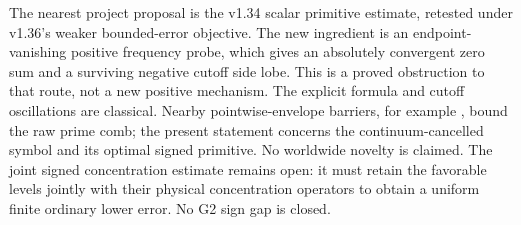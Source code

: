 The nearest project proposal is the v1.34 scalar primitive estimate,
retested under v1.36's weaker bounded-error objective. The new ingredient
is an endpoint-vanishing positive frequency probe, which gives an
absolutely convergent zero sum and a surviving negative cutoff side lobe.
This is a proved obstruction to that route, not a new positive mechanism.
The explicit formula and cutoff oscillations are classical. Nearby
pointwise-envelope barriers, for example \cite{Zhu2026}, bound the raw
prime comb; the present statement concerns the continuum-cancelled
symbol and its optimal signed primitive. No worldwide novelty is claimed.
The joint signed concentration estimate remains open: it must retain
the favorable levels jointly with their physical concentration operators
to obtain a uniform finite ordinary lower error. No G2 sign gap is closed.

